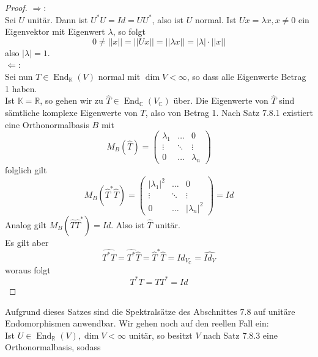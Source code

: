 \documentclass[12pt,a4paper]{article}
\theoremstyle{definition}
\theoremstyle{remark}
\renewcommand{\hat}[1]{\widehat{#1}}
\DeclareMathOperator{\End}{End}
\begin{document}
	\begin{proof}
		$\Rightarrow$: \\
		Sei $U$ unitär. Dann ist $U^*U=Id=UU^*$, also ist $U$ normal. Ist $Ux=\lambda x, x \neq 0$ ein Eigenvektor mit Eigenwert $\lambda$, so folgt
		\begin{equation}
			0 \neq ||x||=||Ux||=||\lambda x||=|\lambda|\cdot ||x||
		\end{equation}
		also $|\lambda|=1$. \\
		$\Leftarrow$: \\
		Sei nun $T \in \End_{\mathbb{K}}(V)$ normal mit $\dim V < \infty$, so dass alle Eigenwerte Betrag 1 haben. \\
		Ist $\mathbb{K=\mathbb{R}}$, so gehen wir zu $\hat{T} \in \End_{\mathbb{C}}(V_{\mathbb{C}})$ über. Die Eigenwerte von $\hat{T}$ sind sämtliche komplexe Eigenwerte von $T$, also von Betrag 1. Nach Satz 7.8.1 existiert eine Orthonormalbasis $B$ mit
		\begin{equation}
			M_B(\hat{T})=\begin{pmatrix}
				\lambda_1 & \dots & 0 \\
				\vdots & \ddots & \vdots \\
				0 & \dots & \lambda_n
			\end{pmatrix}
		\end{equation}
		folglich gilt
		\begin{equation}
			M_B(\hat{T}^*\hat{T})= \begin{pmatrix}
				|\lambda_1|^2 & \dots & 0 \\
				\vdots & \ddots & \vdots \\
				0 & \dots & |\lambda_n|^2
			\end{pmatrix} = Id
		\end{equation}
		Analog gilt $M_B(\hat{T}\hat{T}^*)=Id$.
		Also ist $\hat{T}$ unitär. \\		
		Es gilt aber
		\begin{equation}
			\hat{T^*T}= \hat{T^*}\hat{T}=\hat{T}^* \hat{T}=Id_{V_{\mathbb{C}}}=\hat{Id_V}
		\end{equation}
		woraus folgt
		\begin{equation}
			T^*T=TT^*=Id
		\end{equation}
	\end{proof}
	Aufgrund dieses Satzes sind die Spektralsätze des Abschnittes 7.8 auf unitäre Endomorphismen anwendbar. Wir gehen noch auf den reellen Fall ein: \\	
	Ist $U \in \End_{\mathbb{R}}(V), \dim V < \infty$ unitär, so besitzt $V$ nach Satz 7.8.3 eine Orthonormalbasis, sodass
\end{document}
